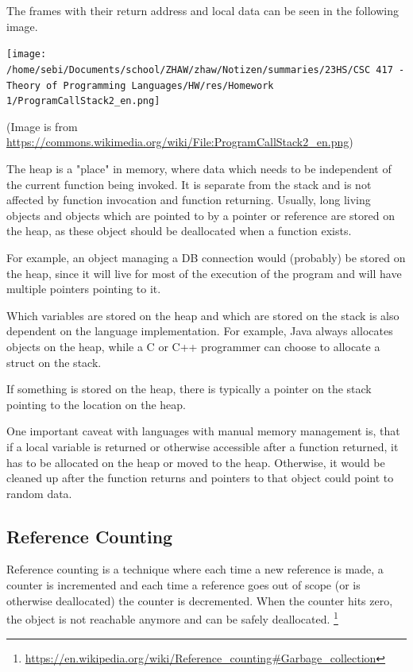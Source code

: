 \documentclass[
]{article}
\begin{document}
The frames with their return address and local data can be seen in the
following image.

\texttt{[image: /home/sebi/Documents/school/ZHAW/zhaw/Notizen/summaries/23HS/CSC 417 - Theory of Programming Languages/HW/res/Homework 1/ProgramCallStack2\_en.png]}

(Image is from
\url{https://commons.wikimedia.org/wiki/File:ProgramCallStack2_en.png})

The heap is a "place" in memory, where data which needs to be
independent of the current function being invoked. It is separate from
the stack and is not affected by function invocation and function
returning. Usually, long living objects and objects which are pointed to
by a pointer or reference are stored on the heap, as these object should
be deallocated when a function exists.

For example, an object managing a DB connection would (probably) be
stored on the heap, since it will live for most of the execution of the
program and will have multiple pointers pointing to it.

Which variables are stored on the heap and which are stored on the stack
is also dependent on the language implementation. For example, Java
always allocates objects on the heap, while a C or C++ programmer can
choose to allocate a struct on the stack.

If something is stored on the heap, there is typically a pointer on the
stack pointing to the location on the heap.

One important caveat with languages with manual memory management is,
that if a local variable is returned or otherwise accessible after a
function returned, it has to be allocated on the heap or moved to the
heap. Otherwise, it would be cleaned up after the function returns and
pointers to that object could point to random data.

\subsection{Reference Counting}\label{reference-counting}

Reference counting is a technique where each time a new reference is
made, a counter is incremented and each time a reference goes out of
scope (or is otherwise deallocated) the counter is decremented. When the
counter hits zero, the object is not reachable anymore and can be safely
deallocated. \footnote{\url{https://en.wikipedia.org/wiki/Reference_counting\#Garbage_collection}}
\end{document}
